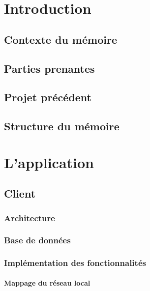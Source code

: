 \chapter{Introduction}

\section{Contexte du mémoire}
\section{Parties prenantes}
\section{Projet précédent}
\section{Structure du mémoire}







\chapter{L'application}
\label{sec:archi}


\section{Client}

\subsection{Architecture}
\subsection{Base de données}

\subsection{Implémentation des fonctionnalités}
\subsubsection{Mappage du réseau local}


